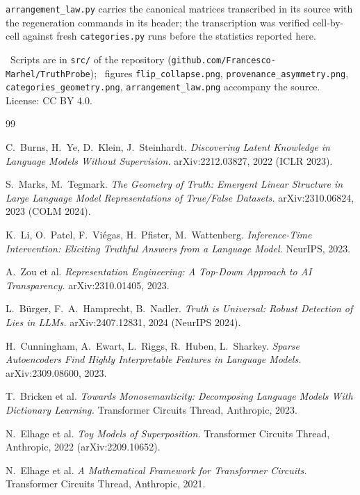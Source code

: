 \documentclass[11pt]{article}
\begin{document}
\texttt{arrangement\_law.py} carries the canonical matrices transcribed in
its source with the regeneration commands in its header; the transcription
was verified cell-by-cell against fresh \texttt{categories.py} runs before
the statistics reported here.

\ Scripts are in \texttt{src/} of the
repository (\texttt{github.com/Francesco-Marhel/TruthProbe}); \
figures
\texttt{flip\_collapse.png}, \texttt{provenance\_asymmetry.png},
\texttt{categories\_geometry.png}, \texttt{arrangement\_law.png} accompany
the source. License: CC BY 4.0.




\begin{thebibliography}{99}

 C.~Burns, H.~Ye, D.~Klein, J.~Steinhardt.
\emph{Discovering Latent Knowledge in Language Models Without Supervision.}
arXiv:2212.03827, 2022 (ICLR 2023).

 S.~Marks, M.~Tegmark.
\emph{The Geometry of Truth: Emergent Linear Structure in Large Language
Model Representations of True/False Datasets.}
arXiv:2310.06824, 2023 (COLM 2024).

 K.~Li, O.~Patel, F.~Vi\'egas, H.~Pfister, M.~Wattenberg.
\emph{Inference-Time Intervention: Eliciting Truthful Answers from a
Language Model.} NeurIPS, 2023.

 A.~Zou et al.
\emph{Representation Engineering: A Top-Down Approach to AI Transparency.}
arXiv:2310.01405, 2023.

 L.~B\"urger, F.~A.~Hamprecht, B.~Nadler.
\emph{Truth is Universal: Robust Detection of Lies in LLMs.}
arXiv:2407.12831, 2024 (NeurIPS 2024).

 H.~Cunningham, A.~Ewart, L.~Riggs, R.~Huben,
L.~Sharkey. \emph{Sparse Autoencoders Find Highly Interpretable Features in
Language Models.} arXiv:2309.08600, 2023.

 T.~Bricken et al.
\emph{Towards Monosemanticity: Decomposing Language Models With Dictionary
Learning.} Transformer Circuits Thread, Anthropic, 2023.

 N.~Elhage et al.
\emph{Toy Models of Superposition.}
Transformer Circuits Thread, Anthropic, 2022 (arXiv:2209.10652).

 N.~Elhage et al.
\emph{A Mathematical Framework for Transformer Circuits.}
Transformer Circuits Thread, Anthropic, 2021.


\end{thebibliography}
\end{document}

